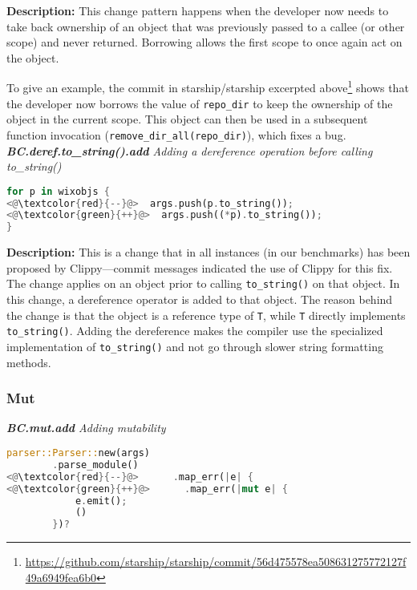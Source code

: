 \noindent\textbf{Description:} This change pattern happens when the developer now needs to take back ownership of an object that was previously passed to a callee (or other scope) and never returned. Borrowing allows the first scope to once again act on the object.

To give an example, the commit in starship/starship excerpted above\footnote{\scriptsize \url{https://github.com/starship/starship/commit/56d475578ea508631275772127f49a6949fea6b0}} shows that the developer now borrows the value of \verb+repo_dir+ to keep the ownership of the object in the current scope. This object can then be used in a subsequent function invocation (\verb+remove_dir_all(repo_dir)+), which fixes a bug. \\

\noindent\textit{\textbf{BC.deref.to\_string().add} Adding a dereference operation before calling to\_string()}

\begin{lstlisting}[language=Rust, style=colouredRust]
for p in wixobjs {
<@\textcolor{red}{--}@>  args.push(p.to_string());
<@\textcolor{green}{++}@>  args.push((*p).to_string());
}

\end{lstlisting}

\noindent\textbf{Description:} This is a change that in all instances (in our benchmarks) has been proposed by Clippy---commit messages indicated the use of Clippy for this fix. The change applies on an object prior to calling \verb+to_string()+ on that object. In this change, a dereference operator is added to that object. The reason behind the change is that the object is a reference type of \verb+T+, while \verb+T+ directly implements \verb+to_string()+. Adding the dereference makes the compiler use the specialized implementation of \verb+to_string()+ and not go through slower string formatting methods.


\subsubsection{Mut}

\noindent\textit{\textbf{BC.mut.add} Adding mutability}

\begin{lstlisting}[language=Rust, style=colouredRust]
parser::Parser::new(args)
        .parse_module()
<@\textcolor{red}{--}@>      .map_err(|e| {
<@\textcolor{green}{++}@>      .map_err(|mut e| {
            e.emit();
            ()
        })?
\end{lstlisting}

